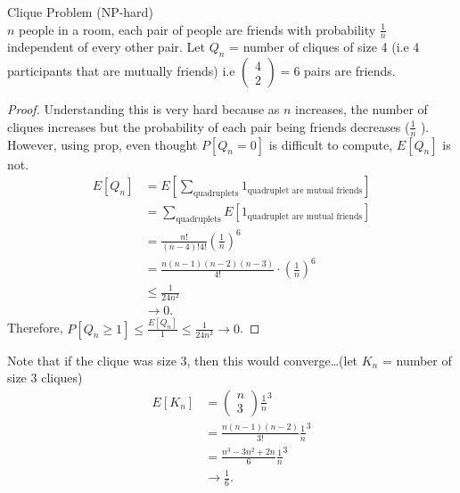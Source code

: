 \documentclass[a4paper]{article}
\begin{document}
\begin{note}{Clique Problem (NP-hard)}\\
 $n$ people in a room, each pair of people are friends with probability  $\frac{1}{n}$ independent of every other pair. Let $Q_n$ = number of cliques of size 4 (i.e 4 participants that are mutually friends) i.e $\begin{pmatrix} 4\\ 2 \end{pmatrix} = 6$  pairs are friends.
 \begin{proof}
   Understanding this is very hard because as $n$ increases, the number of cliques increases but the probability of each pair being friends decreases  ($\frac{1}{n}$ ). However, using prop, even thought $P[Q_n=0]$ is difficult to compute,  $E[Q_n]$ is not.
   \begin{align*}
     E[Q_n] &= E[\sum_{\text{quadruplets}} 1_{\text{quadruplet are mutual friends}}] \\
            &= \sum_{\text{quadruplets}} E[1_{\text{quadruplet are mutual friends}}] \\
            &= \frac{n!}{(n-4)!4!} \left( \frac{1}{n} \right)^{6} \\
            &= \frac{n(n-1)(n-2)(n-3)}{4!} \cdot (\frac{1}{n})^{6} \\
            &\leq \frac{1}{24n^{2}} \\
            &\to 0
   .\end{align*}
   Therefore, $P[Q_n \geq 1] \leq \frac{E[Q_n]}{1} \leq \frac{1}{24n^{2}} \to 0$.
 \end{proof}
\end{note}
\begin{remark}
   Note that if the clique was size 3, then this would converge\ldots (let $K_n$ = number of size 3 cliques)
   \begin{align*}
     E[K_n] &= \begin{pmatrix} n\\ 3 \end{pmatrix} \frac{1}{n}^{3} \\
            &= \frac{n(n-1)(n-2)}{3!}\frac{1}{n}^{3}\\
            &= \frac{n^{3} -3n^{2} + 2n }{6} \frac{1}{n}^{3} \\
            &\to \frac{1}{6}
   .\end{align*}
\end{remark}
\end{document}
